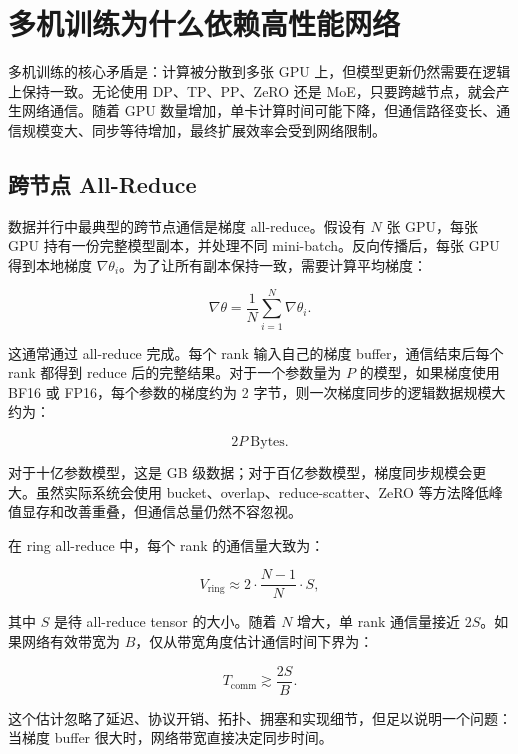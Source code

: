 \section{多机训练为什么依赖高性能网络}
\label{sec:why-high-performance-network}

多机训练的核心矛盾是：计算被分散到多张 GPU 上，但模型更新仍然需要在逻辑上保持一致。无论使用 DP、TP、PP、ZeRO 还是 MoE，只要跨越节点，就会产生网络通信。随着 GPU 数量增加，单卡计算时间可能下降，但通信路径变长、通信规模变大、同步等待增加，最终扩展效率会受到网络限制。

\subsection{跨节点 All-Reduce}
\label{subsec:cross-node-allreduce}

数据并行中最典型的跨节点通信是梯度 all-reduce。假设有 $N$ 张 GPU，每张 GPU 持有一份完整模型副本，并处理不同 mini-batch。反向传播后，每张 GPU 得到本地梯度 $\nabla \theta_i$。为了让所有副本保持一致，需要计算平均梯度：

\[
  \nabla \theta = \frac{1}{N}\sum_{i=1}^{N}\nabla \theta_i.
\]

这通常通过 all-reduce 完成。每个 rank 输入自己的梯度 buffer，通信结束后每个 rank 都得到 reduce 后的完整结果。对于一个参数量为 $P$ 的模型，如果梯度使用 BF16 或 FP16，每个参数的梯度约为 2 字节，则一次梯度同步的逻辑数据规模大约为：

\[
  2P\ \text{Bytes}.
\]

对于十亿参数模型，这是 GB 级数据；对于百亿参数模型，梯度同步规模会更大。虽然实际系统会使用 bucket、overlap、reduce-scatter、ZeRO 等方法降低峰值显存和改善重叠，但通信总量仍然不容忽视。

在 ring all-reduce 中，每个 rank 的通信量大致为：

\[
  V_{\text{ring}} \approx 2 \cdot \frac{N-1}{N} \cdot S,
\]

其中 $S$ 是待 all-reduce tensor 的大小。随着 $N$ 增大，单 rank 通信量接近 $2S$。如果网络有效带宽为 $B$，仅从带宽角度估计通信时间下界为：

\[
  T_{\text{comm}} \gtrsim \frac{2S}{B}.
\]

这个估计忽略了延迟、协议开销、拓扑、拥塞和实现细节，但足以说明一个问题：当梯度 buffer 很大时，网络带宽直接决定同步时间。

